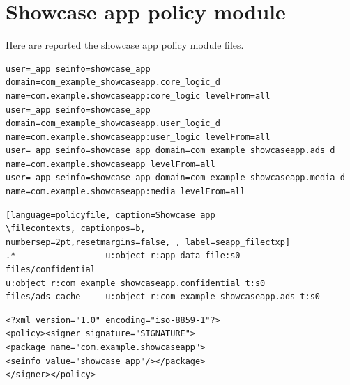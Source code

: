 

\newpage


\section[Policy module]{Showcase app policy module}\label{appendix:seapp_policy}

Here are reported the showcase app policy module files.
\vspace{0.6em}
\begin{lstlisting}[language=policyfile, caption=Showcase app
\seappcontexts, captionpos=b, numbersep=2pt,
resetmargins=false, label=seapp_seappctxp]
user=_app seinfo=showcase_app domain=com_example_showcaseapp.core_logic_d name=com.example.showcaseapp:core_logic levelFrom=all
user=_app seinfo=showcase_app domain=com_example_showcaseapp.user_logic_d name=com.example.showcaseapp:user_logic levelFrom=all
user=_app seinfo=showcase_app domain=com_example_showcaseapp.ads_d name=com.example.showcaseapp levelFrom=all
user=_app seinfo=showcase_app domain=com_example_showcaseapp.media_d name=com.example.showcaseapp:media levelFrom=all
\end{lstlisting}
\vspace{0.6em}
\begin{lstlisting}[language=policyfile, caption=Showcase app
\filecontexts, captionpos=b,
numbersep=2pt,resetmargins=false, , label=seapp_filectxp]
.*                  u:object_r:app_data_file:s0
files/confidential  u:object_r:com_example_showcaseapp.confidential_t:s0
files/ads_cache     u:object_r:com_example_showcaseapp.ads_t:s0
\end{lstlisting}
\vspace{0.6em}
\begin{lstlisting}[language=policyfile, caption=Showcase app
\macpermissions, captionpos=b, numbersep=2pt, resetmargins=false, label=seapp_macctxp]
<?xml version="1.0" encoding="iso-8859-1"?>
<policy><signer signature="SIGNATURE">
<package name="com.example.showcaseapp">
<seinfo value="showcase_app"/></package>
</signer></policy>
\end{lstlisting}
\vspace{0.6em}
